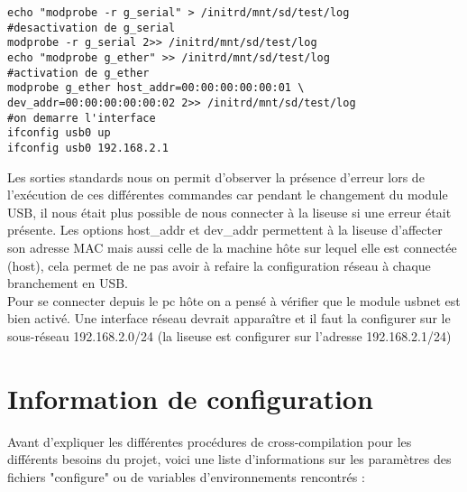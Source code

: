 \begin{lstlisting}
echo "modprobe -r g_serial" > /initrd/mnt/sd/test/log
#desactivation de g_serial
modprobe -r g_serial 2>> /initrd/mnt/sd/test/log
echo "modprobe g_ether" >> /initrd/mnt/sd/test/log
#activation de g_ether
modprobe g_ether host_addr=00:00:00:00:00:01 \
dev_addr=00:00:00:00:00:02 2>> /initrd/mnt/sd/test/log
#on demarre l'interface
ifconfig usb0 up
ifconfig usb0 192.168.2.1
\end{lstlisting}		

Les sorties standards nous on permit d'observer la présence d'erreur lors de l'exécution de ces différentes commandes car pendant le changement du module USB, il nous était plus possible de nous connecter à la liseuse si une erreur était présente.
Les options host_addr et dev_addr permettent à la liseuse d'affecter son adresse MAC mais aussi celle de la machine hôte sur lequel elle est connectée (host), cela permet de ne pas avoir à refaire la configuration réseau à chaque branchement en USB.	\\
	Pour se connecter depuis le pc hôte on a pensé à vérifier que le module usbnet est bien activé.	
	Une interface réseau devrait apparaître et il faut la configurer sur le sous-réseau 192.168.2.0/24 (la liseuse est configurer sur l'adresse 192.168.2.1/24)

\newpage

\section{Information de configuration}

Avant d'expliquer les différentes procédures de cross-compilation pour les différents besoins du projet, voici une liste d'informations sur les paramètres des fichiers "configure" ou de variables d'environnements rencontrés :

